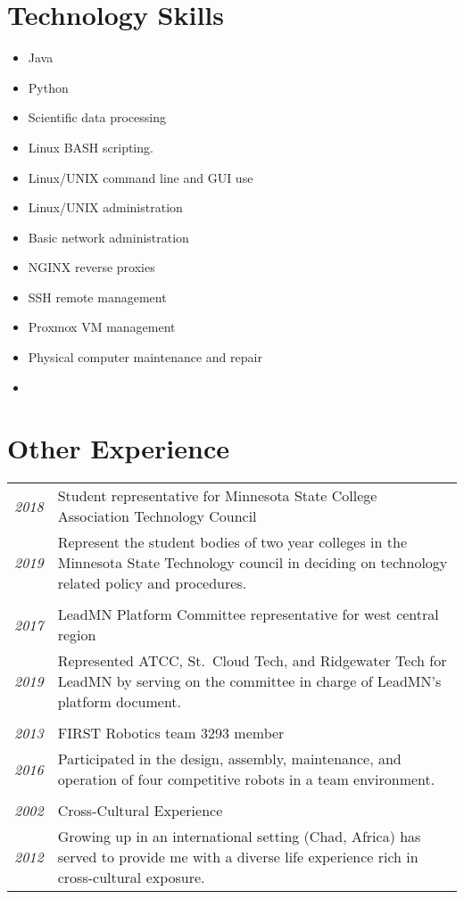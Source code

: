 \documentclass[letterpaper,10pt]{article}
\begin{document}
\section*{Technology Skills}
	\begin{multicols}{2}
	\begin{itemize}
	\item Java
	\item Python
	\item Scientific data processing
	\item Linux BASH scripting.
	\item Linux/UNIX command line and GUI use
	\item Linux/UNIX administration
	\item Basic network administration
	\item NGINX reverse proxies
	\item SSH remote management
	\item Proxmox VM management
	\item Physical computer maintenance and repair
	\item[\vspace{\fill}]
	\end{itemize}
	\end{multicols}
\section*{Other Experience}
	\begin{tabular}{R{2cm}|p{14cm}}
	\textsl{2018} & Student representative for Minnesota State College Association Technology Council\\
	\textsl{2019} & Represent the student bodies of two year colleges in the Minnesota State Technology council in deciding on technology related policy and procedures.\\
	\\
	\textsl{2017} & LeadMN Platform Committee representative for west central region\\
	\textsl{2019} & Represented ATCC, St.\ Cloud Tech, and Ridgewater Tech for LeadMN by serving on the committee in charge of LeadMN's platform document.\\
	\\
	\textsl{2013} & FIRST Robotics team 3293 member\\
	\textsl{2016} & Participated in the design, assembly, maintenance, and operation of four competitive robots in a team environment.\\
	\\
	\textsl{2002} & Cross-Cultural Experience\\
	\textsl{2012} &Growing up in an international setting (Chad, Africa) has served to provide me with a diverse life experience rich in cross-cultural exposure.\\
	\end{tabular}
\end{document}
